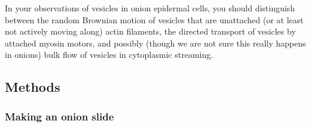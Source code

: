\documentclass{../lab}
\begin{document}
In your observations of vesicles in onion epidermal cells, you should distinguish between the random Brownian motion of vesicles that are unattached (or at least not actively moving along) actin filaments, the directed transport of vesicles by attached myosin motors, and possibly (though we are not sure this really happens in onions) bulk flow of vesicles in cytoplasmic streaming.

\subsection{Methods}

\subsubsection{Making an onion slide}
\end{document}
